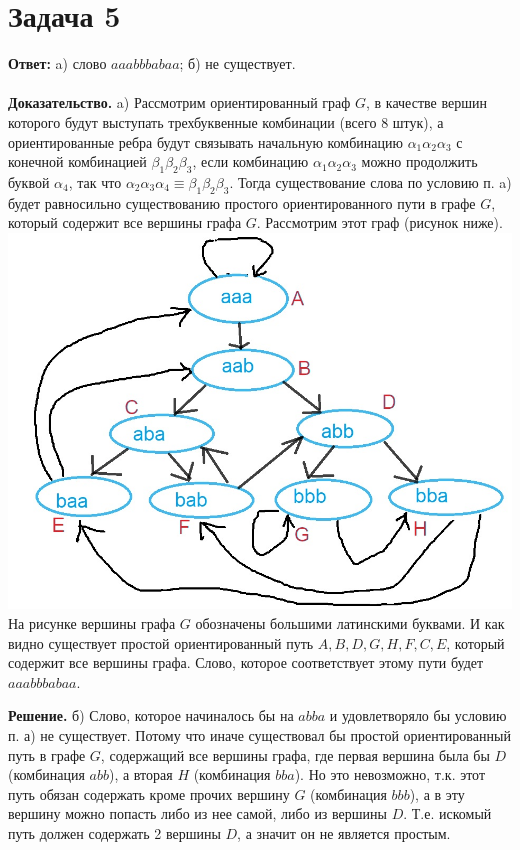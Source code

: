 \documentclass{article}
\begin{document}
\section*{Задача 5}
{\bf Ответ:}  a) слово $aaabbbabaa$; б) не существует.
\\
\\
{\bf Доказательство.} a) Рассмотрим ориентированный граф $G$, в качестве вершин которого будут выступать трехбуквенные комбинации (всего 8 штук), а ориентированные ребра будут связывать начальную комбинацию $\alpha_1\alpha_2\alpha_3$ с конечной комбинацией $\beta_1\beta_2\beta_3$, если комбинацию $\alpha_1\alpha_2\alpha_3$ можно продолжить буквой $\alpha_4$, так что $\alpha_2\alpha_3\alpha_4\equiv \beta_1\beta_2\beta_3$. Тогда существование слова по условию п. a) будет равносильно существованию $\textit{простого}$ ориентированного пути в графе $G$, который содержит все вершины графа $G$. Рассмотрим этот граф (рисунок ниже).
\\
{\includegraphics[scale=0.3]{img/img2.jpg}}
\\
На рисунке вершины графа $G$ обозначены большими латинскими буквами. И как видно существует простой ориентированный путь $A,B,D,G,H,F,C,E$, который содержит все вершины графа. Слово, которое соответствует этому пути будет $aaabbbabaa$.
\par
{\bf Решение.} б) Слово, которое начиналось бы на $abba$ и удовлетворяло бы условию п. а) не существует. Потому что иначе существовал бы простой ориентированный путь в графе $G$, содержащий все вершины графа, где первая вершина была бы $D$ (комбинация $abb$), а вторая $H$ (комбинация $bba$). Но это невозможно, т.к. этот путь обязан содержать кроме прочих вершину $G$ (комбинация $bbb$), а в эту вершину можно попасть либо из нее самой, либо из вершины $D$. Т.е. искомый путь должен содержать 2 вершины $D$, а значит он не является простым.
\end{document}
